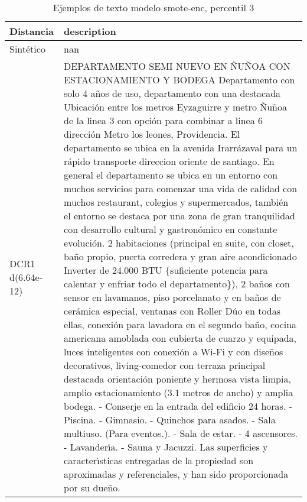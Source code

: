 \begin{table}[H]
\centering
\fontsize{10}{14}\selectfont
\caption{Ejemplos de texto modelo smote-enc, percentil 3}
\label{table-example-economicos-a-3-smote-enc-3p-text}
\begin{tabular}{|l|m{35em}|}
\hline
\rowcolor[gray]{0.8}
Distancia & description \\
\hline Sintético & nan \\
\hline DCR1 d(6.64e-12) & DEPARTAMENTO SEMI NUEVO EN \~NU\~NOA CON ESTACIONAMIENTO Y BODEGA  Departamento con solo 4 a\~nos de uso, departamento con una destacada Ubicaci\'on entre los metros Eyzaguirre y metro \~Nu\~noa de la linea 3 con opci\'on para combinar a linea 6 direcci\'on Metro los leones, Providencia. El departamento se ubica en la avenida Irarr\'azaval para un r\'apido transporte direccion oriente de santiago.  En general el departamento se ubica en un entorno con muchos servicios para comenzar una vida de calidad con muchos restaurant, colegios y supermercados, tambi\'en el entorno se destaca por una zona de gran tranquilidad con desarrollo cultural y gastron\'omico en constante evoluci\'on.   2 habitaciones (principal en suite, con closet, ba\~no propio, puerta corredera y gran aire acondicionado Inverter de 24.000 BTU \{suficiente potencia para calentar y enfriar todo el departamento\}), 2 ba\~nos con sensor en lavamanos, piso porcelanato y en ba\~nos de cer\'amica especial, ventanas con Roller D\'uo en todas ellas, conexi\'on para lavadora en el segundo ba\~no, cocina americana amoblada con cubierta de cuarzo y equipada, luces inteligentes con conexi\'on a Wi-Fi y con dise\~nos decorativos, living-comedor con terraza principal destacada orientaci\'on poniente y hermosa vista limpia, amplio estacionamiento (3.1 metros de ancho) y amplia bodega.   - Conserje en la entrada del edificio 24 horas. - Piscina. - Gimnasio. - Quinchos para asados. - Sala multiuso. (Para eventos.). - Sala de estar. - 4 ascensores. - Lavander{\'\i}a. - Sauna y Jacuzzi.   Las superficies y caracter{\'\i}sticas entregadas de la propiedad son aproximadas y referenciales, y han sido proporcionada por su due\~no. \\

\end{tabular}
\end{table}
